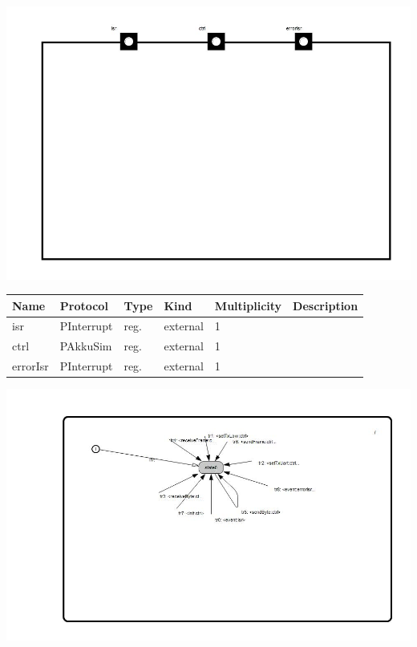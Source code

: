 
{
\centering{}
\includegraphics[width=1.0\textwidth]{./images/AAkkuSimUart5_structure.jpg}
}

\begin{tabular}[ht]{|l|l|l|l|l|p{5cm}|}
\hline
\textbf{Name} & \textbf{Protocol} & \textbf{Type} & \textbf{Kind} & \textbf{Multiplicity} & \textbf{Description}\\
\hline
isr & PInterrupt & reg. & external & 1 & \\
\hline
ctrl & PAkkuSim & reg. & external & 1 & \\
\hline
errorIsr & PInterrupt & reg. & external & 1 & \\
\hline
\end{tabular}

{
\centering{}
\includegraphics[width=1.0\textwidth]{./images/AAkkuSimUart5_behavior.jpg}
}

\begin{par}

\end{par}



